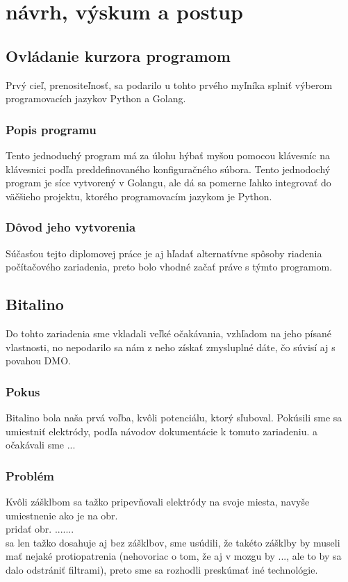 \chapter{návrh, výskum a postup}

\section{Ovládanie kurzora programom}
\tab[5 mm] Prvý cieľ, prenositeľnosť, sa podarilo u tohto prvého myľníka splniť výberom programovacích jazykov Python a Golang.
\subsection{Popis programu}
\tab[5 mm] Tento jednoduchý program má za úlohu  hýbať myšou pomocou klávesníc na klávesnici podľa preddefinovaného konfiguračného súbora. Tento jednodochý program je síce vytvorený v Golangu, ale dá sa pomerne ľahko integrovať do väčšieho projektu, ktorého programovacím jazykom je Python.
\subsection{Dôvod jeho vytvorenia}
\tab[5 mm] Súčasťou tejto diplomovej práce je aj hľadať alternatívne spôsoby riadenia počítačového zariadenia, preto bolo vhodné začať práve s týmto programom.
\section{Bitalino} 
\tab[5 mm] Do tohto zariadenia sme vkladali veľké očakávania, vzhľadom na jeho písané vlastnosti, no nepodarilo sa nám z neho získať zmysluplné dáte, čo súvisí aj s povahou DMO.
\subsection{Pokus}
\tab[5 mm] Bitalino bola naša prvá voľba, kvôli potenciálu, ktorý sľuboval. Pokúsili sme sa umiestniť elektródy, podľa návodov dokumentácie k tomuto zariadeniu.  a očakávali sme ...
\subsection{Problém}
\tab[5 mm] Kvôli zášklbom sa tažko pripevňovali elektródy na svoje miesta, navyše umiestnenie ako je na obr.\\
pridať obr. .......\\
sa len tažko dosahuje aj bez zášklbov, sme usúdili, že takéto zášklby by museli mať nejaké protiopatrenia (nehovoriac o tom, že aj v mozgu by ..., ale to by sa dalo odstrániť filtrami),%
 preto sme sa rozhodli preskúmať iné technológie. 
